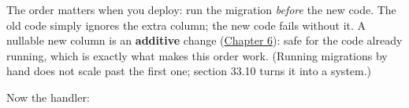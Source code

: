 \begin{codebox}[short]

\begin{Shaded}
\begin{Highlighting}[]
\OperatorTok{{-}\textgreater{}} \NormalTok{:}
\OperatorTok{=} 
    \NormalTok{ (}\NormalTok{, }\NormalTok{):}
          \NormalTok{:   }
\OperatorTok{=}
\end{Highlighting}
\end{Shaded}

\end{codebox}

\noindent{}The order matters when you deploy: run the migration \emph{before} the new code. The old code simply ignores the extra column; the new code fails without it. A nullable new column is an \textbf{additive} change (\hyperref[ch:06-local-dependencies]{Chapter 6}): safe for the code already running, which is exactly what makes this order work. (Running migrations by hand does not scale past the first one; section 33.10 turns it into a system.)

Now the handler:

